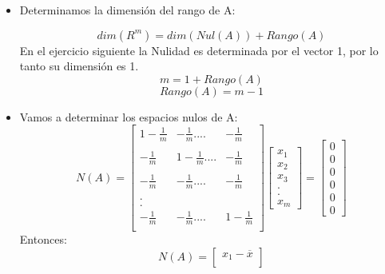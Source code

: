 \documentclass[12pt]{article}
\begin{document}
    \begin{itemize}
        \item Determinamos la dimensión del rango de A:
        
        \[
            dim(R^m) = dim(Nul(A))+Rango(A)
        \]
        En el ejercicio siguiente la Nulidad es determinada por el vector 1, por lo tanto su dimensión es 1.
        \[
            m = 1+Rango(A)
        \]
        \[
            Rango(A) = m-1
        \]
        
    \end{itemize}
    
    \begin{itemize}
        \item Vamos a determinar los espacios nulos de A:
        \[
            N(A) = 
            \begin{bmatrix}
            1-\frac{1}{m} & -\frac{1}{m}.... & -\frac{1}{m}\\\\
            -\frac{1}{m} &  1-\frac{1}{m}.... & -\frac{1}{m}\\\\
            -\frac{1}{m} & -\frac{1}{m}.... & -\frac{1}{m}\\\\
            .\\
            .\\
            -\frac{1}{m} & -\frac{1}{m}.... & 1-\frac{1}{m}\\
            \end{bmatrix}
            \begin{bmatrix}
            x_1\\
            x_2\\
            x_3\\
            .\\
            .\\
            x_m
            \end{bmatrix}
            =
            \begin{bmatrix}
            0\\
            0\\
            0\\
            0\\
            0\\
            0
            \end{bmatrix}
        \]
        Entonces:
        \[
            N(A) = \begin{bmatrix}
            x_1 - \overline{x} \\

\end{bmatrix}\]
\end{itemize}
\end{document}
